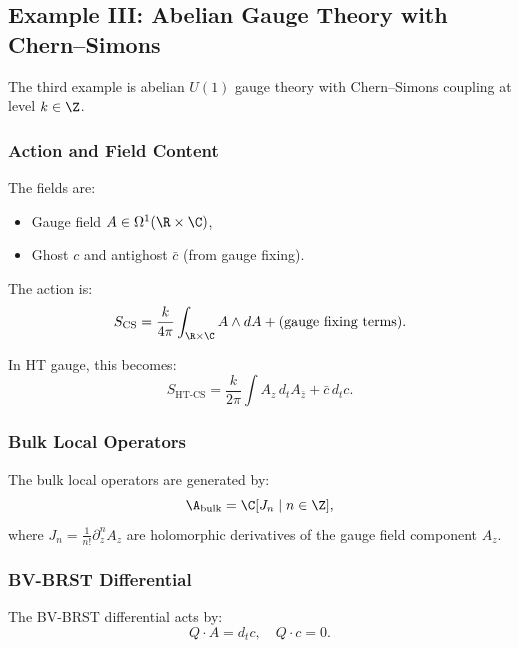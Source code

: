 \subsection{Example III: Abelian Gauge Theory with Chern--Simons}

The third example is abelian $U(1)$ gauge theory with Chern--Simons coupling at level $k \in \Z$.

\subsubsection{Action and Field Content}

The fields are:
\begin{itemize}
\item Gauge field $A \in \Omega^1(\R \times \C)$,
\item Ghost $c$ and antighost $\bar{c}$ (from gauge fixing).
\end{itemize}

The action is:
\begin{equation}
S_{\text{CS}} = \frac{k}{4\pi} \int_{\R \times \C} A \wedge dA + \text{(gauge fixing terms)}.
\end{equation}

In HT gauge, this becomes:
\begin{equation}
S_{\text{HT-CS}} = \frac{k}{2\pi} \int A_z \, d_t A_{\bar{z}} + \bar{c} \, d_t c.
\end{equation}

\subsubsection{Bulk Local Operators}

The bulk local operators are generated by:
\begin{equation}
\A_{\text{bulk}} = \C[J_n \mid n \in \Z],
\end{equation}
where $J_n = \frac{1}{n!} \partial_z^n A_z$ are holomorphic derivatives of the gauge field component $A_z$.

\subsubsection{BV-BRST Differential}

The BV-BRST differential acts by:
\begin{equation}
Q \cdot A = d_t c, \quad Q \cdot c = 0.
\end{equation}

